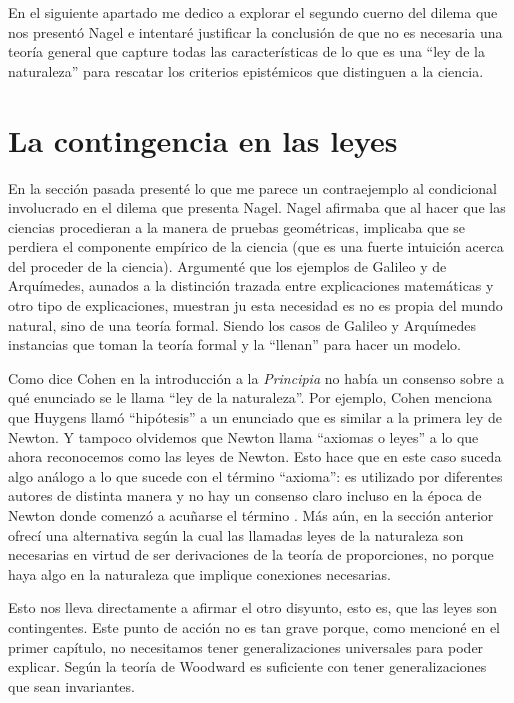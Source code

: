 En el siguiente apartado me dedico a explorar el segundo cuerno del dilema que nos presentó Nagel e intentaré justificar la conclusión de que no es necesaria una teoría general que capture todas las características de lo que es una ``ley de la naturaleza'' para rescatar los criterios epistémicos que distinguen a la ciencia.

\section{La contingencia en las leyes}

\noindent En la sección pasada presenté lo que me parece un contraejemplo al condicional involucrado en el dilema que presenta Nagel. Nagel afirmaba que al hacer que las ciencias procedieran a la manera de pruebas geométricas, implicaba que se perdiera el componente empírico de la ciencia (que es una fuerte intuición acerca del proceder de la ciencia). Argumenté que los ejemplos de Galileo y de Arquímedes, aunados a la distinción trazada entre explicaciones matemáticas y otro tipo de explicaciones,  muestran ju esta necesidad es no es propia del mundo natural, sino de una teoría formal. Siendo los casos de Galileo y Arquímedes instancias que toman la teoría formal y la ``llenan'' para hacer un modelo.

Como dice Cohen en la introducción a la \textit{Principia} \cite{principia} no había un consenso sobre a qué enunciado se le llama ``ley de la naturaleza''. Por ejemplo, Cohen menciona que Huygens llamó ``hipótesis'' a un enunciado que es similar a la primera ley de Newton. Y tampoco olvidemos que Newton llama ``axiomas o leyes'' a lo que ahora reconocemos como las leyes de Newton. Esto hace que en este caso suceda algo análogo a lo que sucede con el término ``axioma'': es utilizado por diferentes autores de distinta manera y no hay un consenso claro incluso en la época de Newton donde comenzó a acuñarse el término \cite{heath2015}. Más aún, en la sección anterior ofrecí una alternativa según la cual las llamadas leyes de la naturaleza son necesarias en virtud de ser derivaciones de la teoría de proporciones, no porque haya algo en la naturaleza que implique conexiones necesarias.

Esto nos lleva directamente a afirmar el otro disyunto, esto es, que las leyes son contingentes. Este punto de acción no es tan grave porque, como mencioné en el primer capítulo, no necesitamos tener generalizaciones universales para poder explicar. Según la teoría de Woodward es suficiente con tener generalizaciones que sean invariantes.

